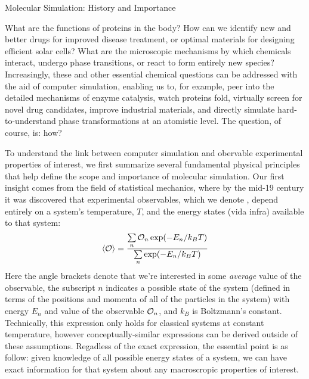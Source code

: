 \begin{section}{Molecular Simulation: History and Importance}

What are the functions of proteins in the body? How can we identify new and better drugs for improved
disease treatment, or optimal materials for designing efficient solar cells?
What are the microscopic mechanisms by which chemicals interact, undergo phase
transitions, or react to form entirely new species? Increasingly, these and other 
essential chemical questions can be addressed with the aid of computer
simulation, 
\cite{VanGunsteren1990,Hospital2015,Chen2015,Karplus2002,Ciccotti2014}
enabling us to, for example, peer into the detailed mechanisms of enzyme catalysis,
\cite{Warshel2003}
watch proteins fold,
\cite{Levitt1975,Lane2013,Piana2014,Perez2016}
virtually screen for novel drug candidates, 
\cite{DeVivo2016}
improve industrial materials,
\cite{Jiang2011,Maurin2016,Bereau2016}
and directly simulate hard-to-understand phase transformations at an atomistic level.
\cite{Kalikmanov2013,Wilding2001}
The question, of course, is: how?


To understand the link between computer simulation and obervable experimental properties
of interest,\footnotemark{} we first summarize several fundamental
physical principles
that help define the
scope and importance of molecular simulation.
Our first insight comes from the field of
statistical mechanics, where by the mid-19 century it was discovered
that experimental observables, which we denote \obs, depend entirely on
a system's temperature, $T$, and the energy states (vida infra) available to that system:
%
\begin{align}
\label{eq:intro-boltzmann}
\braket{\mathcal{O}} = \frac{\sum\limits_n \mathcal{O}_n \exp (-E_n/k_BT)}
                    {\sum\limits_n \exp (-E_n/k_BT)}
\end{align}
%
Here the angle brackets denote that we're interested in some \emph{average}
value of the observable, the subscript $n$ indicates a possible state of the
system (defined in terms of the positions and momenta of all of the particles
in the system) with energy $E_n$ and value of the observable
$\mathcal{O}_n$, 
and $k_B$ is Boltzmann's constant.\cite{allen1989computer}
 Technically,
this expression only holds for classical systems at constant temperature,
however conceptually-similar expressions can be derived outside of these
assumptions. 
Regadless of the exact expression, the essential point is as follow:
given knowledge of all possible energy states of a system, we can
have exact information for that system about any macroscropic properties of
interest. 


\end{section}
